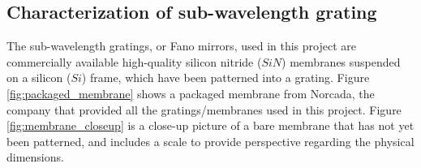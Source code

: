 \subsection{Characterization of sub-wavelength grating}\label{sec:grating_characterization}

The sub-wavelength gratings, or Fano mirrors, used in this project are commercially available high-quality silicon nitride ($SiN$) membranes suspended on a silicon ($Si$) frame, which have been patterned into a grating. Figure \ref{fig:packaged_membrane} shows a packaged membrane from Norcada, the company that provided all the gratings/membranes used in this project. Figure \ref{fig:membrane_closeup} is a close-up picture of a bare membrane that has not yet been patterned, and includes a scale to provide perspective regarding the physical dimensions.

